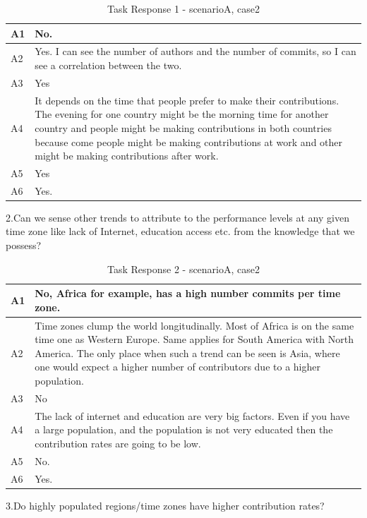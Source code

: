 \documentclass[seploa]{beavtex}
\begin{document}
\begin{appendices}
\begin{table}[H]
\begin{tabular}{ |p{2cm}|p{12cm}| }
 \hline
 A1 & No.\\
 \hline
 A2 & Yes. I can see the number of authors and the number of commits, so I can see a correlation between the two.\\ \hline
 A3 & Yes\\ \hline
 A4 & It depends on the time that people prefer to make their contributions. The evening for one country might be the morning time for another country and people might be making contributions in both countries because come people might be making contributions at work and other might be making contributions after work.\\ \hline
 A5 & Yes\\ \hline
 A6 & Yes.\\
 \hline
\end{tabular}
\caption{Task Response 1 - scenarioA, case2}
\label{tab:table11}
\end{table}

2.Can we sense other trends to attribute to the performance levels at any given time zone like lack of Internet, education access etc. from the knowledge that we possess?

\begin{table}[H]
\begin{tabular}{ |p{2cm}|p{12cm}| }
 \hline
 A1 & No, Africa for example, has a high number commits per time zone.\\
 \hline
 A2 & Time zones clump the world longitudinally. Most of Africa is on the same time one as Western Europe. Same applies for South America with North America. The only place when such a trend can be seen is Asia, where one would expect a higher number of contributors due to a higher population.\\ \hline
 A3 & No\\ \hline
 A4 & The lack of internet and education are very big factors. Even if you have a large population, and the population is not very educated then the contribution rates are going to be low.\\ \hline
 A5 & No.\\ \hline
 A6 & Yes.\\
 \hline
\end{tabular}
\caption{Task Response 2 - scenarioA, case2}
\label{tab:table12}
\end{table}

3.Do highly populated regions/time zones have higher contribution rates?


\end{appendices}
\end{document}
